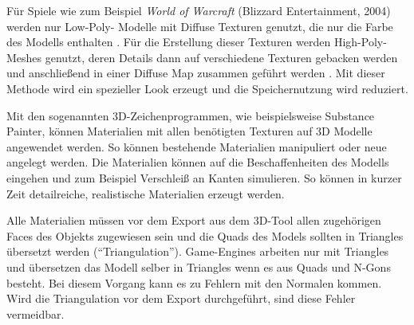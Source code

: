 \enlargethispage{10.5pt}
\par
Für Spiele wie zum Beispiel \textit{World of Warcraft} (Blizzard Entertainment, 2004) werden nur Low-Poly- Modelle mit Diffuse Texturen genutzt, die nur die Farbe des Modells enthalten \parencite{WoW}. Für die Erstellung dieser Texturen werden High-Poly-Meshes genutzt, deren Details dann auf verschiedene Texturen gebacken werden und anschließend in einer Diffuse Map zusammen geführt werden \parencite{WoW}. Mit dieser Methode wird ein spezieller Look erzeugt und die Speichernutzung wird reduziert.
\par
Mit den sogenannten 3D-Zeichenprogrammen, wie beispielsweise Substance Painter, können Materialien mit allen benötigten Texturen auf 3D Modelle angewendet werden. So können bestehende Materialien manipuliert oder neue angelegt werden. Die Materialien können auf die Beschaffenheiten des Modells eingehen und zum Beispiel Verschleiß an Kanten simulieren. So können in kurzer Zeit detailreiche, realistische Materialien erzeugt werden.
\par
Alle Materialien müssen vor dem Export aus dem 3D-Tool allen zugehörigen Faces des Objekts zugewiesen sein und die Quads des Models sollten in Triangles übersetzt werden (\enquote{Triangulation}). Game-Engines arbeiten nur mit Triangles und übersetzen das Modell selber in Triangles wenn es aus Quads und N-Gons besteht. Bei diesem Vorgang kann es zu Fehlern mit den Normalen kommen. Wird die Triangulation vor dem Export durchgeführt, sind diese Fehler vermeidbar.
